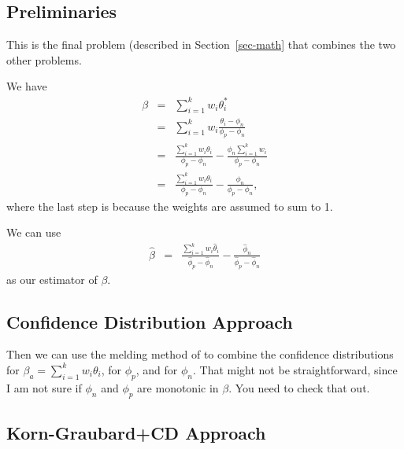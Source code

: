 \documentclass{article}
\begin{document}
\subsection{Preliminaries}

This is the final problem (described in Section~\ref{sec-math} that combines the two other problems.

We have
\begin{eqnarray*}
\beta & = & \sum_{i=1}^{k} w_i \theta_i^*  \\
& = &  \sum_{i=1}^{k} w_i  \frac{ \theta_i - \phi_n }{ \phi_p - \phi_n} \\
& = &   \frac{ \sum_{i=1}^{k} w_i  \theta_i  }{ \phi_p - \phi_n} - \frac{ \phi_n \sum_{i=1}^{k} w_i    }{ \phi_p - \phi_n} \\
& = &   \frac{ \sum_{i=1}^{k} w_i  \theta_i  }{ \phi_p - \phi_n} - \frac{ \phi_n     }{ \phi_p - \phi_n},
\end{eqnarray*}
where the last step is because the weights are assumed to sum to 1.

We can use
\begin{eqnarray*}
\hat{\beta} & = &   \frac{ \sum_{i=1}^{k} w_i  \hat{\theta}_i  }{ \hat{\phi}_p - \hat{\phi}_n} - \frac{ \hat{\phi}_n   }{ \hat{\phi}_p - \hat{\phi}_n} 
\end{eqnarray*}
as our estimator of $\beta$. 

\subsection{Confidence Distribution Approach}

Then we can use the melding method of \citet{FayP:2015} to combine the confidence distributions for $\beta_a = \sum_{i=1}^{k} w_i  {\theta}_i$, for $\phi_p$,
and for $\phi_n$. That might not be straightforward, since I am not sure if $\phi_n$ and $\phi_p$ are monotonic in $\beta$. You need to check that out.

\subsection{Korn-Graubard+CD Approach} 
\end{document}
